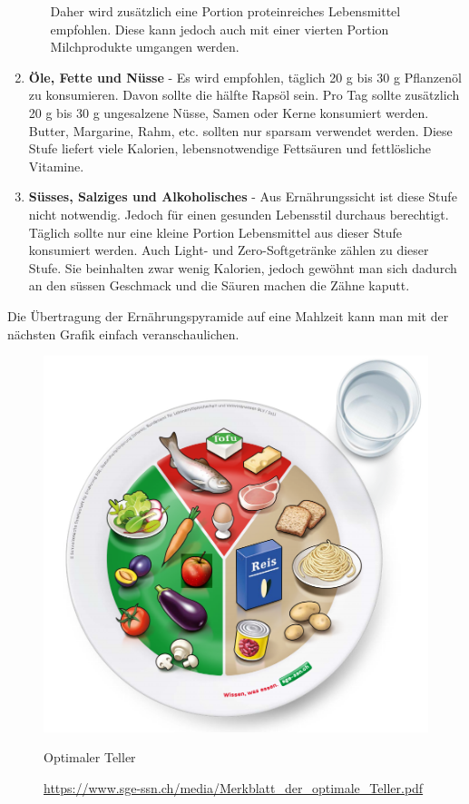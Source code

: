 \begin{enumerate}
\begin{enumerate}
    \newline
    Daher wird zusätzlich eine Portion proteinreiches Lebensmittel empfohlen. Diese kann jedoch auch mit einer vierten Portion Milchprodukte umgangen werden. \cite{stufe_fleisch_fisch_eier_tofu_2}
  \end{enumerate}
  \item \textbf{Öle, Fette und Nüsse} - Es wird empfohlen, täglich 20 g bis 30 g Pflanzenöl zu konsumieren. Davon sollte die hälfte Rapsöl sein. Pro Tag sollte zusätzlich 20 g bis 30 g ungesalzene Nüsse, Samen oder Kerne konsumiert werden.
  \newline
  Butter, Margarine, Rahm, etc. sollten nur sparsam verwendet werden.
  \newline
  Diese Stufe liefert viele Kalorien, lebensnotwendige Fettsäuren und fettlösliche Vitamine. \cite{stufe_le_fette_nuesse}
  \item \textbf{Süsses, Salziges und Alkoholisches} - Aus Ernährungssicht ist diese Stufe nicht notwendig. Jedoch für einen gesunden Lebensstil durchaus berechtigt. 
  Täglich sollte nur eine kleine Portion Lebensmittel aus dieser Stufe konsumiert werden.
  Auch Light- und Zero-Softgetränke zählen zu dieser Stufe. Sie beinhalten zwar wenig Kalorien, jedoch gewöhnt man sich dadurch an den süssen Geschmack und die Säuren machen die Zähne kaputt. \cite{stufe_suesses_salziges_alkoholisches}
\end{enumerate}
Die Übertragung der Ernährungspyramide auf eine Mahlzeit kann man mit der nächsten Grafik einfach veranschaulichen.
\newline
\begin{figure}[!hbpt]
  \centering
  \includegraphics[width=0.45\linewidth]{./images/der_perfekte_teller.png}
  \caption{Optimaler Teller}
  \label{fig:teller}
  \caption*{\url{https://www.sge-ssn.ch/media/Merkblatt_der_optimale_Teller.pdf}}
\end{figure}
\newline
